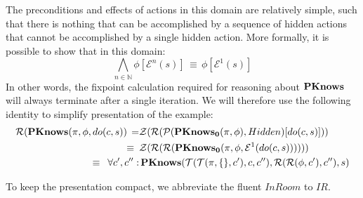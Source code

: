 The preconditions and effects of actions in this domain are relatively
simple, such that there is nothing that can be accomplished by a sequence
of hidden actions that cannot be accomplished by a single hidden action.
More formally, it is possible to show that in this domain:\[
\bigwedge_{n\in\mathbb{N}}\phi[\mathcal{E}^{n}(s)]\,\equiv\,\phi[\mathcal{E}^{1}(s)]\]
 In other words, the fixpoint calculation required for reasoning about
$\mathbf{PKnows}$ will always terminate after a single iteration. We will
therefore use the following identity to simplify presentation of the
example:\begin{align*}
\mathcal{R}(\mathbf{PKnows}(\pi,\phi,do(c,s))\,= & \mathcal{Z}(\mathcal{R}(\mathcal{P}(\mathbf{PKnows_{0}}(\pi,\phi),Hidden)[do(c,s)]))\\
\equiv\,\,\, & \mathcal{Z}(\mathcal{R}(\mathcal{R}(\mathbf{PKnows_{0}}(\pi,\phi,\mathcal{E}^{1}(do(c,s))))))\\
\equiv\,\,\,\forall c',c'': & \,\mathbf{PKnows}(\mathcal{T}(\mathcal{T}(\pi,\{\},c'),c,c''),\mathcal{R}(\mathcal{R}(\phi,c'),c''),s)\end{align*}


To keep the presentation compact, we abbreviate the fluent $InRoom$
to $IR$.

